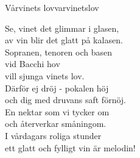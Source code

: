 \begin{song}{Vårvinets lov}{varvinetslov}

\begin{vers}
Se, vinet det glimmar i glasen,\\
av vin blir det glatt på kalasen.\\
Sopranen, tenoren och basen\\
vid Bacchi hov\\
vill sjunga vinets lov.\\
Därför ej dröj - pokalen höj\\
och dig med druvans saft förnöj.\\
En nektar som vi tycker om\\
och återverkar småningom.\\
I vårdagars roliga stunder\\
ett glatt och fylligt vin är melodin!\\
\end{vers}
\end{song}

